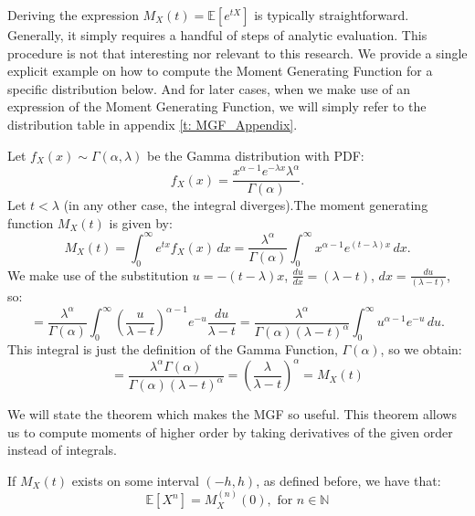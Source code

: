 \begin{remark}
    Deriving the expression \(M_X(t) = \mathbb{E}[e^{tX}]\) is typically straightforward. Generally, it simply requires a handful of steps of analytic evaluation. This procedure is not that interesting nor relevant to this research. We provide a single explicit example on how to compute the Moment Generating Function for a specific distribution below. And for later cases, when we make use of an expression of the Moment Generating Function, we will simply refer to the distribution table in appendix \ref{t: MGF_Appendix}.
\end{remark}

\begin{example}
    Let \(f_X(x) \sim \Gamma(\alpha, \lambda)\) be the Gamma distribution with PDF:
     \[
     f_X(x) = \frac{x^{\alpha -1} e^{-\lambda x} \lambda^\alpha}{\Gamma(\alpha)}.
     \]
     Let \( t < \lambda\) (in any other case, the integral diverges).The moment generating function \(M_X(t)\) is given by:
     \[
     M_X(t) = \int_{0}^{\infty} e^{tx} f_X(x) \, dx = \frac{\lambda^\alpha}{\Gamma(\alpha)} \int_{0}^{\infty} x^{\alpha -1} e^{(t - \lambda) x} \, dx.
     \]
     We make use of the substitution \(u = -(t - \lambda)x\), \(\frac{du}{dx} = (\lambda - t)\), \(dx = \frac{du}{(\lambda - t)}\), so:
     \[
     = \frac{\lambda^\alpha}{\Gamma(\alpha)} \int_{0}^{\infty} \left(\frac{u}{\lambda - t}\right)^{\alpha -1} e^{-u} \frac{du}{\lambda - t} = \frac{\lambda^\alpha}{\Gamma(\alpha) (\lambda - t)^\alpha} \int_{0}^{\infty} u^{\alpha -1} e^{-u} \, du.
     \] This integral is just the definition of the Gamma Function, \(\Gamma(\alpha)\), so we obtain:
     \[ = \frac{\lambda^\alpha \Gamma(\alpha)}{\Gamma(\alpha) (\lambda - t)^\alpha} = \left(\frac{\lambda}{\lambda - t}\right)^\alpha = M_X(t)\]
 \end{example}
 
We will state the theorem which makes the MGF so useful. This theorem allows us to compute moments of higher order by taking derivatives of the given order instead of integrals.
\begin{theorem}\label{t: mgf}
    If \(M_X(t)\) exists on some interval \((-h, h)\), as defined before, we have that:
    \[ \mathbb{E}[X^n] = M_X^{(n)}(0), \text{ for } n \in \mathbb{N}\]
\end{theorem}

